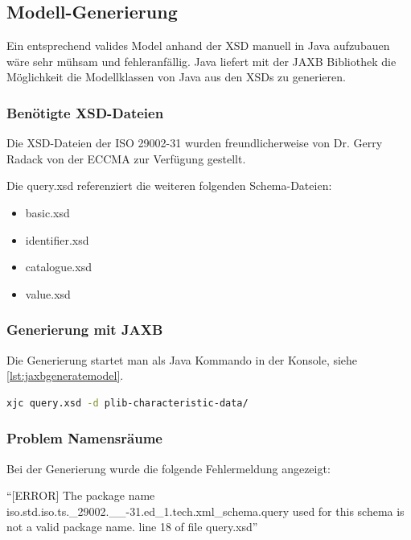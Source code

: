 \subsection{Modell-Generierung}

Ein entsprechend valides Model anhand der XSD manuell in Java aufzubauen wäre sehr mühsam und fehleranfällig. Java liefert mit der JAXB Bibliothek die Möglichkeit die Modellklassen von Java aus den XSDs zu generieren.

\subsubsection{Benötigte XSD-Dateien}

Die XSD-Dateien der ISO 29002-31 wurden freundlicherweise von Dr. Gerry Radack von der ECCMA zur Verfügung gestellt. 

Die query.xsd referenziert die weiteren folgenden Schema-Dateien:
\begin{itemize}
\item basic.xsd
\item identifier.xsd
\item catalogue.xsd
\item value.xsd
\end{itemize}

\subsubsection{Generierung mit JAXB}

Die Generierung startet man als Java Kommando in der Konsole, siehe \autoref{lst:jaxbgeneratemodel}.

\begin{lstlisting}[caption=JAXB Modellgenerierung von der Konsole, language=sh, label=lst:jaxbgeneratemodel]
xjc query.xsd -d plib-characteristic-data/ 
\end{lstlisting}

\subsubsection{Problem Namensräume}
Bei der Generierung wurde die folgende Fehlermeldung angezeigt:

\enquote{[ERROR] The package name iso.std.iso.ts.\_29002.\_\_-31.ed\_1.tech.xml\_schema.query used for this schema is not a valid package name. line 18 of file query.xsd}
  
